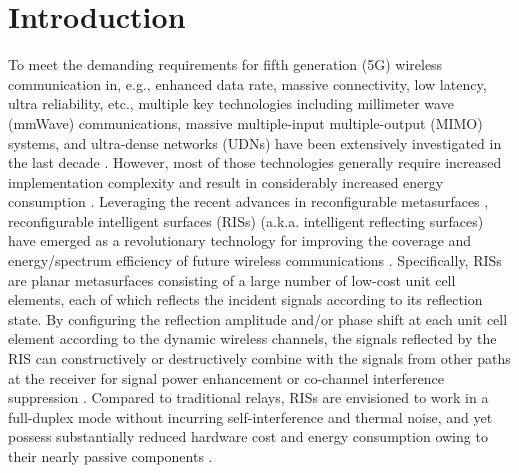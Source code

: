 \documentclass[draftclsnofoot,onecolumn,12pt]{IEEEtran}
\newcommand{\rev}[1]{{\color{red}#1}} %
\newcommand{\rev}[1]{#1}
\begin{document}
\section{Introduction}
To meet the demanding requirements for fifth generation (5G) wireless communication in, e.g., enhanced data rate, massive connectivity, low latency, ultra reliability, etc., multiple key technologies including millimeter wave (mmWave) communications, massive multiple-input multiple-output (MIMO) systems, and ultra-dense networks (UDNs) have been extensively investigated in the last decade \cite{Boccardi20145G}. 
However, most of those technologies generally require increased implementation complexity and result in considerably increased energy consumption
 \cite{Sohrabi2016Hybrid,Ngo2013Energy}. 
Leveraging the recent advances in reconfigurable metasurfaces \cite{Liu2018Metasurfaces,Tie2014Coding}, reconfigurable intelligent surfaces (RISs) (a.k.a. intelligent reflecting surfaces) have emerged as a revolutionary technology for improving the coverage and energy/spectrum efficiency of future wireless communications \cite{Renzo2020Smart,Tan2018Enabling,Liaskos2018a,basar2019wireless,Huang2019Holographic,Renzo2019Reflection,Nemanja2019Channel}. 
Specifically, RISs are planar metasurfaces consisting of a large number of low-cost unit cell elements, each of which reflects the incident signals according to its reflection state. 
By configuring the reflection amplitude and/or phase shift at each unit cell element according to the dynamic wireless channels, the signals reflected by the RIS can constructively or destructively combine with the signals from other paths at the receiver for signal power enhancement or co-channel interference suppression \cite{wu2017towards}. 
Compared to traditional relays, RISs are envisioned to work in a full-duplex mode without incurring self-interference and thermal noise, and yet possess substantially reduced hardware cost and energy consumption owing to their nearly passive components \cite{Huang2019RIS,Huang2018EE,Emil2019IRS,Wankai2019Wireless}. 
\end{document}
